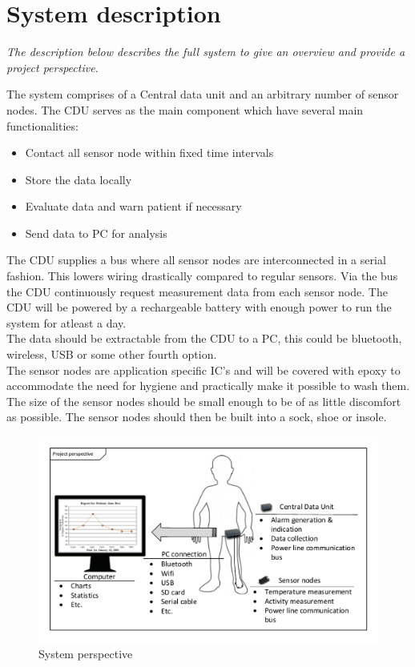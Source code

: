 \chapter{System description}

\textit{The description below describes the full system to give an overview and provide a project perspective.}

The system comprises of a Central data unit and an arbitrary number of sensor nodes. The CDU serves as the main component which have several main functionalities:
\begin{itemize}
	\item Contact all sensor node within fixed time intervals
	\item Store the data locally
	\item Evaluate data and warn patient if necessary
	\item Send data to PC for analysis
\end{itemize}
The CDU supplies a bus where all sensor nodes are interconnected in a serial fashion. This lowers wiring drastically compared to regular sensors.
Via the bus the CDU continuously request measurement data from each sensor node. The CDU will be powered by a rechargeable battery with enough power to run the system for atleast a day.\\
The data should be extractable from the CDU to a PC, this could be bluetooth, wireless, USB or some other fourth option.\\

The sensor nodes are application specific IC's and will be covered with epoxy to accommodate the need for hygiene and practically make it possible to wash them. The size of the sensor nodes should be small enough to be of as little discomfort as possible. The sensor nodes should then be built into a sock, shoe or insole.


\begin{figure}[H]
	\centering
	\includegraphics[width=.7\textwidth]{billeder/6Systemdescription/fullsystem_vector}
	\caption{System perspective}
	\label{fig:full_system}
\end{figure}
